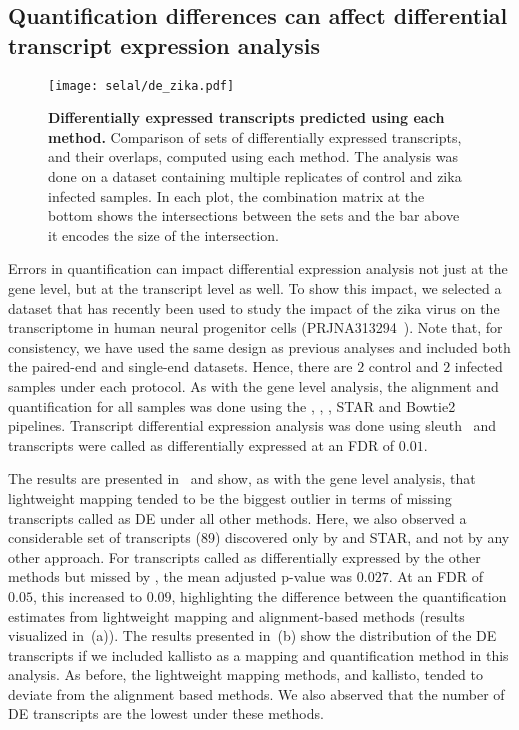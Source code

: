 \subsection{Quantification differences can affect differential transcript expression analysis}
\label{sec:DTE}

\begin{figure}[ht!]
	\centering
	\texttt{[image: selal/de\_zika.pdf]}
    \caption{\textbf{Differentially expressed transcripts predicted using each method.} 
    Comparison of sets of differentially expressed transcripts, and their overlaps, computed using each method.
    The analysis was done on a dataset containing multiple replicates of control and zika infected samples.
 	In each plot, the combination matrix at the bottom shows the intersections between the sets and the bar above
      it encodes the size of the intersection.}
    \label{fig:dte}
\end{figure}

Errors in quantification can impact differential expression analysis not just at the gene level, 
but at the transcript level as well. To show this impact, we selected a dataset that has recently been 
used to study the impact of the zika virus on the transcriptome in human neural progenitor cells (PRJNA313294~\cite{tang2016zika}). 
Note that, for consistency, we have used the same design as previous analyses and included both the
paired-end and single-end datasets. Hence, there are $2$ control and $2$ infected samples under
each protocol. As with the gene level analysis, the alignment and quantification for all samples was done using the \hsa, \saf, \qm, 
STAR and Bowtie2 pipelines. Transcript differential expression analysis was done using sleuth~\cite{pimentel2017differential} and 
transcripts were called as differentially expressed at an FDR of $0.01$. 

The results are presented in~ and
show, as with the gene level analysis, that lightweight mapping tended to be the biggest outlier in terms of 
missing transcripts called as DE under all other methods.  Here, we also observed a considerable 
set of transcripts (89) discovered only by \saf and STAR, and not by any other approach. 
For transcripts called as differentially expressed by the other methods but 
missed by \qm, the mean adjusted p-value was $0.027$. At an FDR of $0.05$, this increased to 
$0.09$, highlighting the difference between the quantification estimates from lightweight mapping
and alignment-based methods (results visualized in~(a)). The results presented 
in~(b) show the distribution of the DE transcripts if we included kallisto as a
mapping and quantification method in this analysis. As before, the lightweight mapping methods, \qm and
kallisto, tended to deviate from the alignment based methods. We also abserved that the number of DE transcripts
are the lowest under these methods. 

